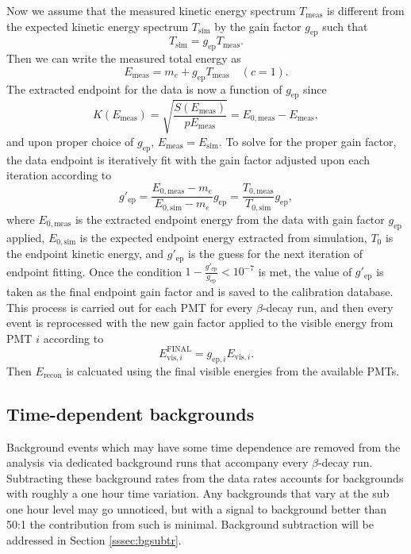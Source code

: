 Now we assume that the measured kinetic energy spectrum $T_{\mathrm{meas}}$ is different from the expected
kinetic energy spectrum $T_{\mathrm{sim}}$ by the gain factor $g_{\mathrm{ep}}$ such that
%
\begin{equation}
  T_{\mathrm{sim}} = g_{\mathrm{ep}} T_{\mathrm{meas}}.
\end{equation}
Then we can write the
measured total energy as
\begin{equation}
  E_{\mathrm{meas}} = m_e + g_{\mathrm{ep}}T_{\mathrm{meas}} \quad (c=1).
\end{equation}
The extracted endpoint for the data is now a function of $g_{\mathrm{ep}}$
since
\begin{equation}
  K(E_{\mathrm{meas}}) = \sqrt{\frac{S(E_{\mathrm{meas}})}{pE_{\mathrm{meas}}}} = E_{0,\mathrm{meas}}-E_{\mathrm{meas}},
\end{equation}
and upon proper choice of $g_{\mathrm{ep}}$, $E_{\mathrm{meas}}=E_{\mathrm{sim}}$. To solve for
the proper gain factor, the data endpoint is iteratively fit with the gain factor adjusted upon each iteration
according to
%
\begin{equation}
  g'_{\mathrm{ep}} = \frac{ E_{0,\mathrm{meas}}- m_e}{ E_{0,\mathrm{sim}}- m_e}g_{\mathrm{ep}} =  \frac{ T_{0,\mathrm{meas}}}{ T_{0,\mathrm{sim}}}g_{\mathrm{ep}}, 
\end{equation}
%
where $E_{0,\mathrm{meas}}$ is the extracted endpoint energy from the data with gain factor $g_{\mathrm{ep}}$ applied,
$E_{0,\mathrm{sim}}$ is the expected endpoint energy extracted from simulation, $T_0$ is the endpoint kinetic energy,
and $g'_{\mathrm{ep}}$ is the guess for the next iteration of endpoint fitting.
Once the condition $1-\frac{g'_{\mathrm{ep}}}{g_{\mathrm{ep}}}<10^{-7}$ is met, the value of $g'_{\mathrm{ep}}$ is taken as the final
endpoint gain factor and is saved to the calibration database. This process is carried out for each PMT for every
$\beta$-decay run, and then every event is reprocessed with the new gain factor applied to the visible energy from PMT
$i$ according to
%
\begin{equation}
  E_{\mathrm{vis},i}^{\mathrm{FINAL}} = g_{\mathrm{ep},i} E_{\mathrm{vis},i}.
\end{equation}
Then $E_{\mathrm{recon}}$ is calcuated using the final visible energies from the available PMTs.



\subsection{Time-dependent backgrounds}
Background events which may have some time dependence are removed from the analysis
via dedicated background runs that accompany every $\beta$-decay run.
Subtracting these background rates from the data rates accounts for backgrounds
with roughly a one hour time variation.
Any backgrounds that vary at the sub one hour level may go unnoticed, but
with a signal to background better than 50:1 the contribution from such is minimal.
Background subtraction will be addressed in Section \ref{sssec:bgsubtr}. 

